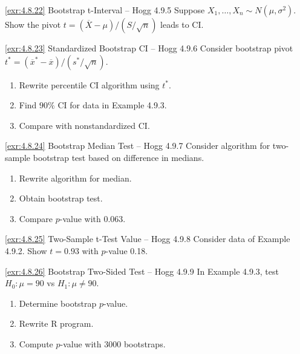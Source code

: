 \begin{exercise}{\ref{exr:4.8.22} Bootstrap t-Interval – Hogg 4.9.5}\label{exr:4.8.22}
Suppose $X_1,\ldots,X_n \sim N(\mu,\sigma^2)$. Show the pivot $t = (\overline{X}-\mu)/(S/\sqrt{n})$ leads to CI.
\end{exercise}

\begin{exercise}{\ref{exr:4.8.23} Standardized Bootstrap CI – Hogg 4.9.6}\label{exr:4.8.23}
Consider bootstrap pivot $t^* = (\overline{x}^* - \overline{x})/(s^*/\sqrt{n})$.
\begin{enumerate}
\item[(a)] Rewrite percentile CI algorithm using $t^*$.
\item[(b)] Find $90\%$ CI for data in Example 4.9.3.
\item[(c)] Compare with nonstandardized CI.
\end{enumerate}
\end{exercise}

\begin{exercise}{\ref{exr:4.8.24} Bootstrap Median Test – Hogg 4.9.7}\label{exr:4.8.24}
Consider algorithm for two-sample bootstrap test based on difference in medians.
\begin{enumerate}
\item[(a)] Rewrite algorithm for median.
\item[(b)] Obtain bootstrap test.
\item[(c)] Compare $p$-value with 0.063.
\end{enumerate}
\end{exercise}

\begin{exercise}{\ref{exr:4.8.25} Two-Sample t-Test Value – Hogg 4.9.8}\label{exr:4.8.25}
Consider data of Example 4.9.2. Show $t=0.93$ with $p$-value 0.18.
\end{exercise}

\begin{exercise}{\ref{exr:4.8.26} Bootstrap Two-Sided Test – Hogg 4.9.9}\label{exr:4.8.26}
In Example 4.9.3, test $H_0: \mu=90$ vs $H_1: \mu \neq 90$.
\begin{enumerate}
\item[(a)] Determine bootstrap $p$-value.
\item[(b)] Rewrite R program.
\item[(c)] Compute $p$-value with 3000 bootstraps.
\end{enumerate}
\end{exercise}

